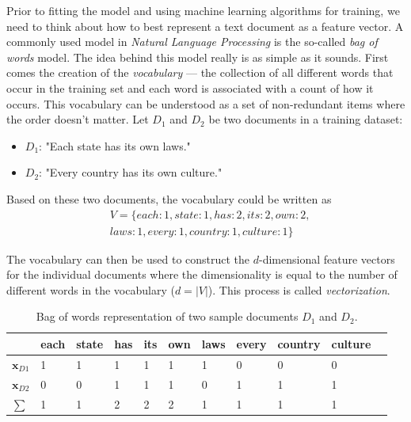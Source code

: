 \documentclass{article}
\begin{document}
Prior to fitting the model and using machine learning algorithms for training, we need to think about how to best represent a text document as a feature vector. A commonly used model in \emph{Natural Language Processing} is the so-called \emph{bag of words} model. The idea behind this model really is as simple as it sounds. First comes the creation of the \emph{vocabulary} --- the collection of all different words that occur in the training set and each word is associated with a count of how it occurs. This vocabulary can be understood as a set of non-redundant items where the order doesn't matter. Let $D_1$ and $D_2$ be two documents in a training dataset:

\begin{itemize}
	\item $D_1$: "Each state has its own laws."
	\item $D_2$: "Every country has its own culture."
\end{itemize}

Based on these two documents, the vocabulary could be written as \\

\begin{equation} 
\begin{split}
&V= \{each: 1, state: 1, has: 2, its: 2, own: 2, \\
& laws: 1, every: 1, country: 1, culture: 1\} 
\end{split}
\end{equation}

The vocabulary can then be used to construct the $d$-dimensional feature vectors for the individual documents where the dimensionality is equal to the number of different words in the vocabulary ($d=|V|$). This process is called \emph{vectorization}.



\begin{table}[h]

\caption{Bag of words representation of two sample documents $D_1$ and $D_2$.}
\begin{tabular}{l l l l l l l l l l l} \hline
& each   & state & has & its & own & laws & every & country & culture &   \\ \hline
$\textbf{x}_{D1}$             & 1     & 1   & 1   & 1   & 1    & 1     & 0       & 0       & 0  \\ 
$\textbf{x}_{D2}$             & 0     & 0   & 1   & 1   & 1    & 0     & 1       & 1       & 1 \\ 
$\sum$ & 1     & 1   & 2   & 2   & 2    & 1     & 1       & 1       & 1 \\ \hline
\end{tabular}
\label{fig:bag_of_words}
\end{table}
\end{document}
